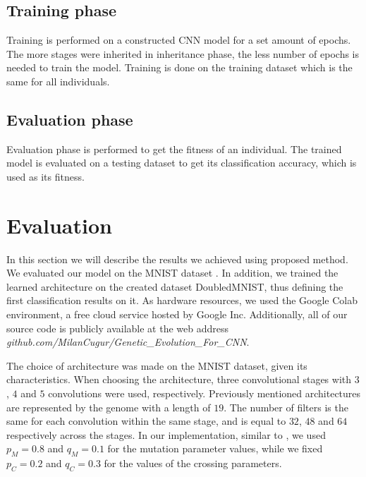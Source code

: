 \documentclass[eng]{simposium}
\begin{document}
\subsection{Training phase} 
Training is performed on a constructed CNN model for a set amount of epochs.  
The more stages were inherited in inheritance phase, the less number of epochs is needed to train the model. 
Training is done on the training dataset which is the same for all individuals. 

\subsection{Evaluation phase} 
Evaluation phase is performed to get the fitness of an individual. 
The trained model is evaluated on a testing dataset to get its classification accuracy, which is used as its fitness. 

\section{Evaluation} 

In this section we will describe the results we achieved using proposed method.  
We evaluated our model on the MNIST dataset \cite{8}. In addition, we trained the learned architecture on the  
created dataset DoubledMNIST, thus defining the first classification results on it.  
As hardware resources, we used the Google Colab environment, a free cloud service hosted by Google Inc. 
Additionally, all of our source code is publicly available at the web address \textit{github.com/MilanCugur/Genetic\_Evolution\_For\_CNN}.  

The choice of architecture was made on the MNIST dataset, given its characteristics.  
When choosing the architecture, three convolutional stages with $3$, $4$ and $5$ convolutions were used, respectively.  
Previously mentioned architectures are represented by the genome with a length of $19$. 
The number of filters is the same for each convolution within the same stage, and is equal to $32$, $48$ and $64$ respectively across the stages.  
In our implementation, similar to \cite{4}, we used $p_M=0.8$ and $q_M=0.1$ for the mutation parameter values, while we fixed $p_C=0.2$ and $q_C=0.3$ for the values of the crossing parameters. 
\end{document}
